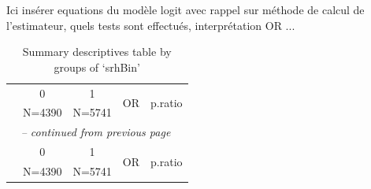 \documentclass{book}
\begin{document}
\bigskip
\noindent
Ici insérer equations du modèle logit avec rappel sur méthode de calcul de l'estimateur, quels tests sont effectués, interprétation OR ...


    \begin{longtable}{lcccc}\caption{Summary descriptives table by groups of `srhBin'}\\
    \hline  
     &      0       &      1       & \multirow{2}{*}{       OR       } & \multirow{2}{*}{p.ratio}\\ 
 &    N=4390    &    N=5741    &                  &         \\ 
  
    \hline
    \hline     
    \endfirsthead 
    \multicolumn{5}{l}{\tablename\ \thetable{} \textit{-- continued from previous page}}\\ 
    \hline
     &      0       &      1       & \multirow{2}{*}{       OR       } & \multirow{2}{*}{p.ratio}\\ 
 &    N=4390    &    N=5741    &                  &         \\ 


\end{longtable}
\end{document}
